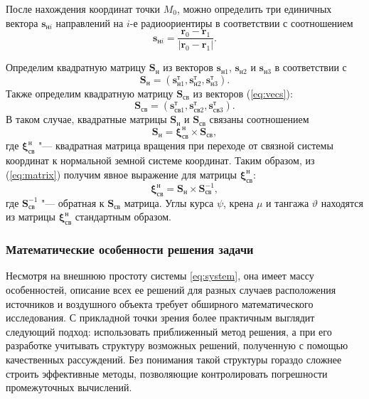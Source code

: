\documentclass[../main.tex]{subfiles}
\begin{document}
После нахождения координат точки $M_0$, можно определить три единичных вектора $\mathbf{s}_{\text{н}i}$ направлений на $i$-е радиоориентиры в соответствии с соотношением
\begin{equation*}
    \mathbf{s}_{\text{н}i} = \frac{\mathbf{r}_0 - \mathbf{r}_1}{|\mathbf{r}_0 - \mathbf{r}_1|}.
\end{equation*}

Определим квадратную матрицу $\mathbf{S}_{\text{н}}$ из векторов $\mathbf{s}_{\text{н}1}$, $\mathbf{s}_{\text{н}2}$ и $\mathbf{s}_{\text{н}3}$ в соответствии с
\begin{equation*}
    \mathbf{S}_{\text{н}} = \left(\mathbf{s}_{\text{н}1}^\text{т}, \mathbf{s}_{\text{н}2}^\text{т}, \mathbf{s}_{\text{н}3}^\text{т}\right).
\end{equation*}
Также определим квадратную матрицу $\mathbf{S}_{\text{св}}$ из векторов (\ref{eq:vecs}):
\begin{equation*}
    \mathbf{S}_{\text{св}} = \left(\mathbf{s}_{\text{св}1}^\text{т}, \mathbf{s}_{\text{св}2}^\text{т}, \mathbf{s}_{\text{св}3}^\text{т}\right).
\end{equation*}
В таком случае, квадратные матрицы $\mathbf{S}_{\text{н}}$ и $\mathbf{S}_{\text{св}}$ связаны соотношением
\begin{equation}\label{eq:matrix}
    \mathbf{S}_{\text{н}} = \mathbf{\xi}_{\text{св}}^{\text{н}} \times \mathbf{S}_{\text{св}},
\end{equation}
где $\mathbf{\xi}_{\text{св}}^{\text{н}}$ "--- квадратная матрица вращения при переходе от связной системы координат к нормальной земной системе координат. Таким образом, из (\ref{eq:matrix}) получим явное выражение для матрицы $\mathbf{\xi}_{\text{св}}^{\text{н}}$:
\begin{equation*}
    \mathbf{\xi}_{\text{св}}^{\text{н}} = \mathbf{S}_{\text{н}} \times \mathbf{S}_{\text{св}}^{-1},
\end{equation*}
где $\mathbf{S}_{\text{св}}^{-1}$ "--- обратная к $\mathbf{S}_{\text{св}}$ матрица. Углы курса $\psi$, крена $\mu$ и тангажа $\vartheta$ находятся из матрицы $\mathbf{\xi}_{\text{св}}^{\text{н}}$ стандартным образом.

\subsubsection{Математические особенности решения задачи}
Несмотря на внешнюю простоту системы \eqref{eq:system}, она имеет массу особенностей, описание всех ее решений для разных случаев расположения источников и воздушного объекта требует обширного математического исследования. С прикладной точки зрения более практичным выглядит следующий подход: использовать приближенный метод решения, а при его разработке учитывать структуру возможных решений, полученную с помощью качественных рассуждений. Без понимания такой структуры гораздо сложнее строить эффективные методы, позволяющие контролировать погрешности промежуточных вычислений.
\end{document}
